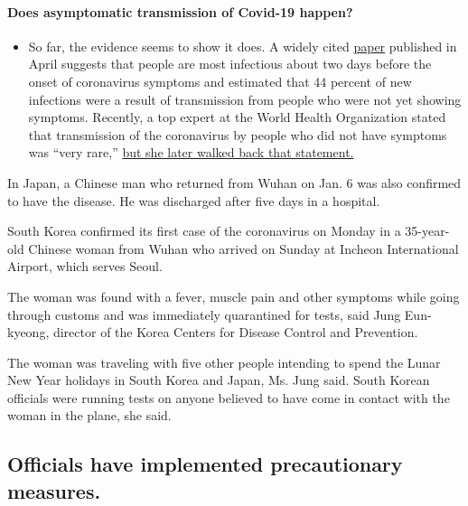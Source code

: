 \begin{itemize}
{  \paragraph{Does asymptomatic transmission of Covid-19
  happen?}\label{does-asymptomatic-transmission-of-covid-19-happen}}

  \begin{itemize}
  \tightlist
  \item
    So far, the evidence seems to show it does. A widely cited
    \href{https://www.nature.com/articles/s41591-020-0869-5}{paper}
    published in April suggests that people are most infectious about
    two days before the onset of coronavirus symptoms and estimated that
    44 percent of new infections were a result of transmission from
    people who were not yet showing symptoms. Recently, a top expert at
    the World Health Organization stated that transmission of the
    coronavirus by people who did not have symptoms was ``very rare,''
    \href{https://www.nytimes.com/2020/06/09/world/coronavirus-updates.html?action=click\&pgtype=Article\&state=default\&region=MAIN_CONTENT_3\&context=storylines_faq\#link-1f302e21}{but
    she later walked back that statement.}
  \end{itemize}
\end{itemize}

In Japan, a Chinese man who returned from Wuhan on Jan. 6 was also
confirmed to have the disease. He was discharged after five days in a
hospital.

South Korea confirmed its first case of the coronavirus on Monday in a
35-year-old Chinese woman from Wuhan who arrived on Sunday at Incheon
International Airport, which serves Seoul.

The woman was found with a fever, muscle pain and other symptoms while
going through customs and was immediately quarantined for tests, said
Jung Eun-kyeong, director of the Korea Centers for Disease Control and
Prevention.

The woman was traveling with five other people intending to spend the
Lunar New Year holidays in South Korea and Japan, Ms. Jung said. South
Korean officials were running tests on anyone believed to have come in
contact with the woman in the plane, she said.

\hypertarget{officials-have-implemented-precautionary-measures}{%
\subsection{Officials have implemented precautionary
measures.}\label{officials-have-implemented-precautionary-measures}}

